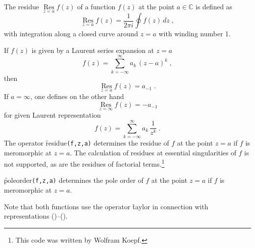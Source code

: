 The residue
$\mathop{\mathrm{Res}}\limits_{z=a} f(z)$ of a function $f(z)$ at the point $a\in\mathbb{C}$ is defined
as
\[
\mathop{\mathrm{Res}}\limits_{z=a} f(z)=
\frac{1}{2 \pi i}\oint f(z)\,dz
\;,
\]
with integration along a closed curve around $z=a$ with winding number 1.

If $f(z)$ is given by a Laurent series expansion at $z=a$
\[
f(z)=\sum_{k=-\infty}^\infty a_k\,(z-a)^k
\;,
\]
then
\begin{equation}
\mathop{\mathrm{Res}}\limits_{z=a} f(z)=a_{-1}
\;.
\label{eq:Laurent}
\end{equation}
If $a=\infty$, one defines on the other hand
\begin{equation}
\mathop{\mathrm{Res}}\limits_{z=\infty} f(z)=-a_{-1}
\label{eq:Laurent2}
\end{equation}
for given Laurent representation
\[
f(z)=\sum_{k=-\infty}^\infty a_k\,\frac{1}{z^k}
\;.
\]
The operator \f{residue}\texttt{(f,z,a)} determines the residue of $f$ at the point $z=a$
if $f$ is meromorphic at $z=a$. The calculation of residues at essential
singularities of $f$ is not supported, as are the residues of factorial terms.\footnote{This code was written by Wolfram Koepf.}

\f{poleorder}\texttt{(f,z,a)} determines the pole order of $f$ at the point $z=a$
if $f$ is meromorphic at $z=a$.

Note that both functions use the operator \f{taylor} in
connection with representations ()--().

